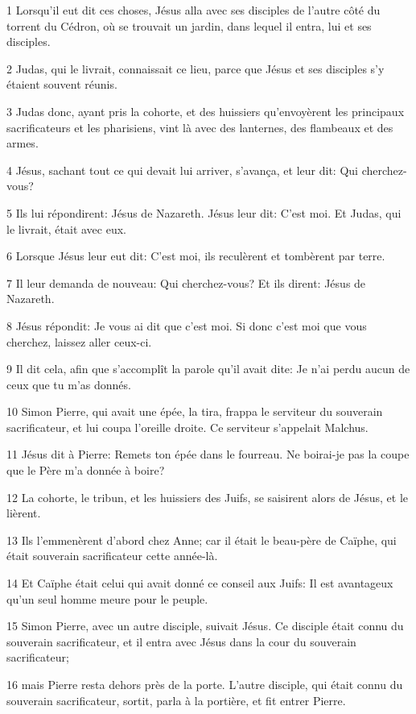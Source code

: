 \par 1 Lorsqu'il eut dit ces choses, Jésus alla avec ses disciples de l'autre côté du torrent du Cédron, où se trouvait un jardin, dans lequel il entra, lui et ses disciples.
\par 2 Judas, qui le livrait, connaissait ce lieu, parce que Jésus et ses disciples s'y étaient souvent réunis.
\par 3 Judas donc, ayant pris la cohorte, et des huissiers qu'envoyèrent les principaux sacrificateurs et les pharisiens, vint là avec des lanternes, des flambeaux et des armes.
\par 4 Jésus, sachant tout ce qui devait lui arriver, s'avança, et leur dit: Qui cherchez-vous?
\par 5 Ils lui répondirent: Jésus de Nazareth. Jésus leur dit: C'est moi. Et Judas, qui le livrait, était avec eux.
\par 6 Lorsque Jésus leur eut dit: C'est moi, ils reculèrent et tombèrent par terre.
\par 7 Il leur demanda de nouveau: Qui cherchez-vous? Et ils dirent: Jésus de Nazareth.
\par 8 Jésus répondit: Je vous ai dit que c'est moi. Si donc c'est moi que vous cherchez, laissez aller ceux-ci.
\par 9 Il dit cela, afin que s'accomplît la parole qu'il avait dite: Je n'ai perdu aucun de ceux que tu m'as donnés.
\par 10 Simon Pierre, qui avait une épée, la tira, frappa le serviteur du souverain sacrificateur, et lui coupa l'oreille droite. Ce serviteur s'appelait Malchus.
\par 11 Jésus dit à Pierre: Remets ton épée dans le fourreau. Ne boirai-je pas la coupe que le Père m'a donnée à boire?
\par 12 La cohorte, le tribun, et les huissiers des Juifs, se saisirent alors de Jésus, et le lièrent.
\par 13 Ils l'emmenèrent d'abord chez Anne; car il était le beau-père de Caïphe, qui était souverain sacrificateur cette année-là.
\par 14 Et Caïphe était celui qui avait donné ce conseil aux Juifs: Il est avantageux qu'un seul homme meure pour le peuple.
\par 15 Simon Pierre, avec un autre disciple, suivait Jésus. Ce disciple était connu du souverain sacrificateur, et il entra avec Jésus dans la cour du souverain sacrificateur;
\par 16 mais Pierre resta dehors près de la porte. L'autre disciple, qui était connu du souverain sacrificateur, sortit, parla à la portière, et fit entrer Pierre.
